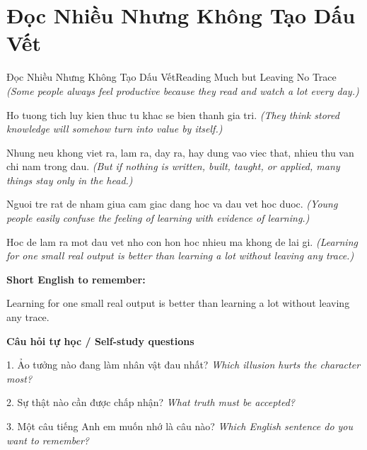 \section{Đọc Nhiều Nhưng Không Tạo Dấu Vết}
\begin{truyen}{Đọc Nhiều Nhưng Không Tạo Dấu Vết}{Reading Much but Leaving No Trace}
\textit{(Some people always feel productive because they read and watch a lot every day.)}

Ho tuong tich luy kien thuc tu khac se bien thanh gia tri.
\textit{(They think stored knowledge will somehow turn into value by itself.)}

Nhung neu khong viet ra, lam ra, day ra, hay dung vao viec that, nhieu thu van chi nam trong dau.
\textit{(But if nothing is written, built, taught, or applied, many things stay only in the head.)}

Nguoi tre rat de nham giua cam giac dang hoc va dau vet hoc duoc.
\textit{(Young people easily confuse the feeling of learning with evidence of learning.)}

\end{truyen}

\begin{baihoc}
Hoc de lam ra mot dau vet nho con hon hoc nhieu ma khong de lai gi.
\textit{(Learning for one small real output is better than learning a lot without leaving any trace.)}
\end{baihoc}

\begin{ghinhoanh}
\textbf{Short English to remember:}

Learning for one small real output is better than learning a lot without leaving any trace.

\end{ghinhoanh}

\begin{tuhocnhanh}
\textbf{Câu hỏi tự học / Self-study questions}

1. Ảo tưởng nào đang làm nhân vật đau nhất? \textit{Which illusion hurts the character most?}

2. Sự thật nào cần được chấp nhận? \textit{What truth must be accepted?}

3. Một câu tiếng Anh em muốn nhớ là câu nào? \textit{Which English sentence do you want to remember?}
\end{tuhocnhanh}
\ngancach


